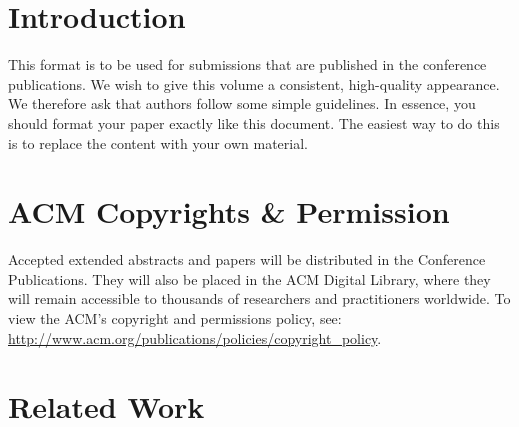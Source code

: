 \documentclass[sigchi-a, authorversion]{acmart}
\begin{document}


\section{Introduction}
This format is to be used for submissions that are published in the
conference publications. We wish to give this volume a consistent,
high-quality appearance. We therefore ask that authors follow some
simple guidelines. In essence, you should format your paper exactly
like this document. The easiest way to do this is to replace the
content with your own material.


\section{ACM Copyrights \& Permission}
Accepted extended abstracts and papers will be distributed in the
Conference Publications. They will also be placed in the ACM Digital
Library, where they will remain accessible to thousands of researchers
and practitioners worldwide. To view the ACM's copyright and
permissions policy, see:
\url{http://www.acm.org/publications/policies/copyright_policy}.


\section{Related Work}
\let\clearpage\relax
 
 









\end{document}
